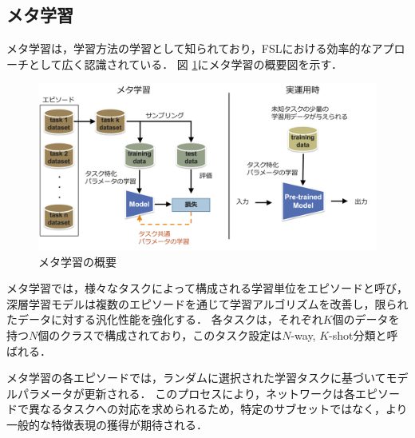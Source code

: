 \documentclass[a4paper,11pt,nomag]{jsreport}
\begin{document}
\subsection{メタ学習}

メタ学習は，学習方法の学習として知られており，FSLにおける効率的なアプローチとして広く認識されている．
図 \ref{fig:meta-learning}にメタ学習の概要図を示す．
% 
\begin{figure}[tbp]
  \centering
  \includegraphics[width=\linewidth, keepaspectratio]{image/meta-learning.png}
  \caption{メタ学習の概要}
  \label{fig:meta-learning}
\end{figure}
% 
メタ学習では，様々なタスクによって構成される学習単位をエピソードと呼び，深層学習モデルは複数のエピソードを通じて学習アルゴリズムを改善し，限られたデータに対する汎化性能を強化する．
各タスクは，それぞれ$K$個のデータを持つ$N$個のクラスで構成されており，このタスク設定は$N$-way, $K$-shot分類と呼ばれる．

メタ学習の各エピソードでは，ランダムに選択された学習タスクに基づいてモデルパラメータが更新される．
このプロセスにより，ネットワークは各エピソードで異なるタスクへの対応を求められるため，特定のサブセットではなく，より一般的な特徴表現の獲得が期待される．
\end{document}
